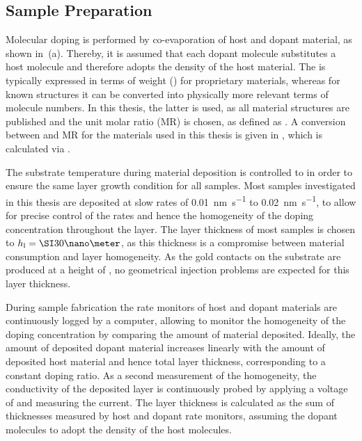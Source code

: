\subsection{Sample Preparation}%
\label{sec:ExpSamplePreparation}%
Molecular doping is performed by co-evaporation of host and dopant material, as shown in \,(a). Thereby, it is assumed that each dopant molecule substitutes a host molecule and therefore adopts the density of the host material. The \CLong \C is typically expressed in terms of weight (\eg \wt{}) for proprietary materials, whereas for known structures it can be converted into physically more relevant terms of molecule numbers. In this thesis, the latter is used, as all material structures are published and the unit molar ratio (MR) is chosen, as defined as . A conversion between \wt{} and MR for the materials used in this thesis is given in , which is calculated via .

The substrate temperature during material deposition is controlled to \Tsub[25] in order to ensure the same layer growth condition for all samples. Most samples investigated in this thesis are deposited at slow rates of \SI{0.01}{\nano\meter\per\second} to \SI{0.02}{\nano\meter\per\second}, to allow for precise control of the rates and hence the homogeneity of the doping concentration throughout the layer.
The layer thickness of most samples is chosen to $\hl=\nm{30}$, as this thickness is a compromise between material consumption and layer homogeneity. As the gold contacts on the substrate are produced at a height of , no geometrical injection problems are expected for this layer thickness.

During sample fabrication the rate monitors of host and dopant materials are continuously logged by a computer, allowing to monitor the homogeneity of the doping concentration by comparing the amount of material deposited. Ideally, the amount of deposited dopant material increases linearly with the amount of deposited host material and hence total layer thickness, corresponding to a constant doping ratio. As a second measurement of the homogeneity, the conductivity of the deposited layer is continuously probed by applying a voltage of \V[10] and measuring the current. The layer thickness is calculated as the sum of thicknesses measured by host and dopant rate monitors, assuming the dopant molecules to adopt the density of the host molecules.

